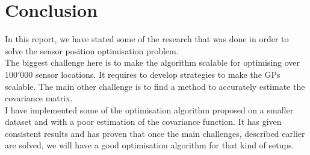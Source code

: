 \chapter{Conclusion}

In this report, we have stated some of the research that was done in order to solve the sensor position optimisation problem. \\ 

The biggest challenge here is to make the algorithm scalable for optimising over $100'000$ sensor locations. It requires to develop strategies to make the GPs scalable. The main other challenge is to find a method to accurately estimate the covariance matrix. \\

I have implemented some of the optimisation algorithm proposed on a smaller dataset and with a poor estimation of the covariance function. It has given consistent results and has proven that once the main challenges, described earlier are solved, we will have a good optimisation algorithm for that kind of setups. 